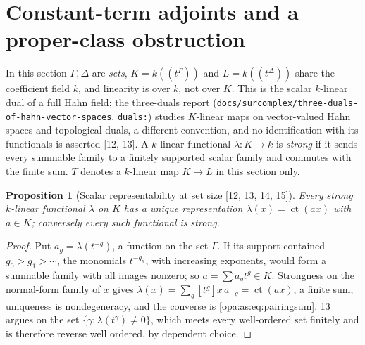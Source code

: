 \documentclass[11pt,oneside]{article}
\numberwithin{equation}{section}
\newtheorem{proposition}[proposition]{Proposition}
\theoremstyle{definition}
\theoremstyle{remark}
\newcommand{\ct}{\operatorname{ct}}
\newcommand{\Hahn}[2]{#1((t^{#2}))}
\newcommand{\coef}[2]{[t^{#1}]#2}
\newcommand{\src}[1]{\textup{\textsf{\small[#1]}}}
\newcommand{\lbl}[1]{\nolinkurl{#1}}
\newcommand{\fn}[1]{\nolinkurl{#1}}
\begin{document}
\section{Constant-term adjoints and a proper-class obstruction}\label{opa:as:sec:adjoint}

In this section $\Gamma,\Delta$ are \emph{sets}, $K=\Hahn k\Gamma$ and $L=\Hahn k\Delta$
share the coefficient field $k$, and linearity is over $k$, not over $K$. This is the
scalar $k$-linear dual of a full Hahn field; the three-duals report
(\fn{docs/surcomplex/three-duals-of-hahn-vector-spaces}, \lbl{duals:}) studies $K$-linear
maps on vector-valued Hahn spaces and topological duals, a different convention, and no
identification with its functionals is asserted \src{12, 13}. A $k$-linear functional
$\lambda:K\to k$ is \emph{strong} if it sends every summable family to a finitely supported
scalar family and commutes with the finite sum. $T$ denotes a $k$-linear map $K\to L$ in
this section only.

\begin{proposition}[Scalar representability at set size \src{12, 13, 14, 15}]\label{opa:as:prop:scalarrep}
Every strong $k$-linear functional $\lambda$ on $K$ has a unique representation
$\lambda(x)=\ct(ax)$ with $a\in K$; conversely every such functional is strong.
\end{proposition}
\begin{proof}
Put $a_g=\lambda(t^{-g})$, a function on the set $\Gamma$. If its support contained
$g_0>g_1>\cdots$, the monomials $t^{-g_n}$, with increasing exponents, would form a summable
family with all images nonzero; so $a=\sum a_gt^g\in K$. Strongness on the normal-form family
of $x$ gives $\lambda(x)=\sum_g\coef gx\,a_{-g}=\ct(ax)$, a finite sum; uniqueness is
nondegeneracy, and the converse is \eqref{opa:as:eq:pairingsum}. 13 argues on the set
$\{\gamma:\lambda(t^\gamma)\ne0\}$, which meets every well-ordered set finitely and is
therefore reverse well ordered, by dependent choice.
\end{proof}
\end{document}
